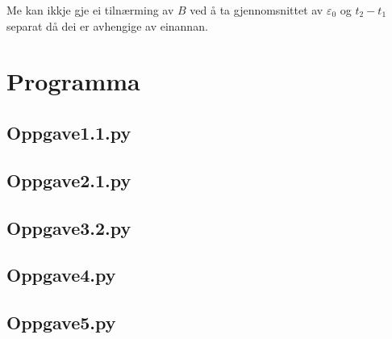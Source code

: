 \documentclass[11pt, a4paper]{article}
\begin{document}
    Me kan ikkje gje ei tilnærming av $B$ ved å ta gjennomsnittet av $\varepsilon_0$ og $t_2 - t_1$ separat då dei er avhengige av einannan.


\section*{Programma}
  \subsection*{Oppgave1.1.py}
    

  \subsection*{Oppgave2.1.py}
    


  \subsection*{Oppgave3.2.py}
    



  \subsection*{Oppgave4.py}
    


  \subsection*{Oppgave5.py}
    
\end{document}
